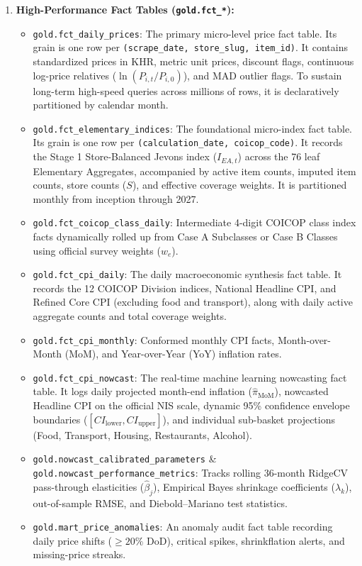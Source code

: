 \begin{enumerate}
    \item \textbf{High-Performance Fact Tables (\texttt{gold.fct\_*}):}
    \begin{itemize}
        \item \texttt{gold.fct\_daily\_prices}: The primary micro-level price fact table. Its grain is one row per \texttt{(scrape\_date, store\_slug, item\_id)}. It contains standardized prices in KHR, metric unit prices, discount flags, continuous log-price relatives ($\ln(P_{i,t}/P_{i,0})$), and MAD outlier flags. To sustain long-term high-speed queries across millions of rows, it is declaratively partitioned by calendar month.
        \item \texttt{gold.fct\_elementary\_indices}: The foundational micro-index fact table. Its grain is one row per \texttt{(calculation\_date, coicop\_code)}. It records the Stage 1 Store-Balanced Jevons index ($I_{EA,t}$) across the 76 leaf Elementary Aggregates, accompanied by active item counts, imputed item counts, store counts ($S$), and effective coverage weights. It is partitioned monthly from inception through 2027.
        \item \texttt{gold.fct\_coicop\_class\_daily}: Intermediate 4-digit COICOP class index facts dynamically rolled up from Case A Subclasses or Case B Classes using official survey weights ($w_e$).
        \item \texttt{gold.fct\_cpi\_daily}: The daily macroeconomic synthesis fact table. It records the 12 COICOP Division indices, National Headline CPI, and Refined Core CPI (excluding food and transport), along with daily active aggregate counts and total coverage weights.
        \item \texttt{gold.fct\_cpi\_monthly}: Conformed monthly CPI facts, Month-over-Month (MoM), and Year-over-Year (YoY) inflation rates.
        \item \texttt{gold.fct\_cpi\_nowcast}: The real-time machine learning nowcasting fact table. It logs daily projected month-end inflation ($\widehat{\pi}_{\text{MoM}}$), nowcasted Headline CPI on the official NIS scale, dynamic 95\% confidence envelope boundaries ($[CI_{\text{lower}}, CI_{\text{upper}}]$), and individual sub-basket projections (Food, Transport, Housing, Restaurants, Alcohol).
        \item \texttt{gold.nowcast\_calibrated\_parameters} \& \texttt{gold.nowcast\_performance\_metrics}: Tracks rolling 36-month RidgeCV pass-through elasticities ($\hat{\beta}_j$), Empirical Bayes shrinkage coefficients ($\lambda_k$), out-of-sample RMSE, and Diebold--Mariano test statistics.
        \item \texttt{gold.mart\_price\_anomalies}: An anomaly audit fact table recording daily price shifts ($\ge 20\%$ DoD), critical spikes, shrinkflation alerts, and missing-price streaks.
    \end{itemize}


\end{enumerate}
